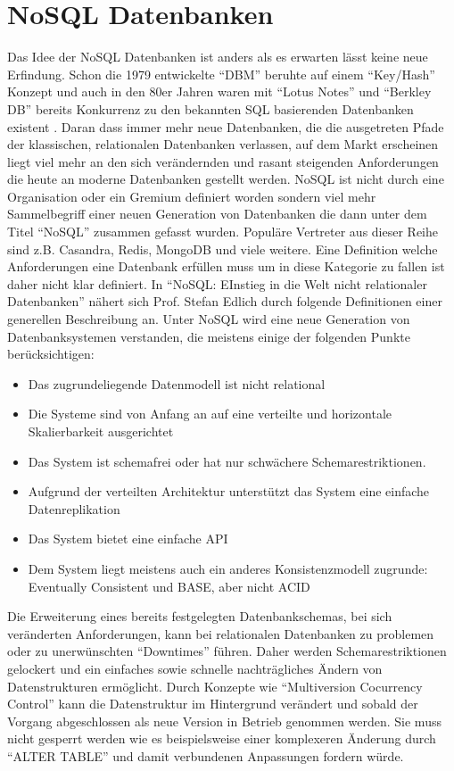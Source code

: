 \documentclass[a4paper,11pt,oneside,%
headsepline,												%
footsepline,												%
bibtotocnumbered									%
]{scrreprt}
\begin{document}
\section{NoSQL Datenbanken}
Das Idee der NoSQL Datenbanken ist anders als es erwarten lässt keine neue Erfindung. Schon die 1979 entwickelte \enquote{DBM} beruhte auf einem \enquote{Key/Hash} Konzept und auch in den 80er Jahren waren mit \enquote{Lotus Notes} und \enquote{Berkley DB} bereits Konkurrenz zu den bekannten SQL basierenden Datenbanken existent \autocite[1]{Edlich2010}. Daran dass immer mehr neue Datenbanken, die die ausgetreten Pfade der klassischen, relationalen Datenbanken verlassen, auf dem Markt erscheinen liegt viel mehr an den sich verändernden und rasant steigenden Anforderungen die heute an moderne Datenbanken gestellt werden. NoSQL ist nicht durch eine Organisation oder ein Gremium definiert worden sondern viel mehr Sammelbegriff einer neuen Generation von Datenbanken die dann unter dem Titel \enquote{NoSQL} zusammen gefasst wurden. Populäre Vertreter aus dieser Reihe sind z.B. Casandra, Redis, MongoDB und viele weitere. Eine Definition welche Anforderungen eine Datenbank erfüllen muss um in diese Kategorie zu fallen ist daher nicht klar definiert. In \enquote{NoSQL: EInstieg in die Welt nicht relationaler Datenbanken} nähert sich Prof. Stefan Edlich durch folgende Definitionen  einer generellen Beschreibung an. Unter NoSQL wird eine neue Generation von Datenbanksystemen verstanden, die meistens einige der folgenden Punkte berücksichtigen\autocite[2]{Edlich2010}:
\begin{itemize}
		\item Das zugrundeliegende Datenmodell ist nicht relational
		\item Die Systeme sind von Anfang an auf eine verteilte und horizontale Skalierbarkeit ausgerichtet
		\item Das System ist schemafrei oder hat nur schwächere Schemarestriktionen.
		\item Aufgrund der verteilten Architektur unterstützt das System eine einfache Datenreplikation
		\item Das System bietet eine einfache API
		\item Dem System liegt meistens auch ein anderes Konsistenzmodell zugrunde: Eventually Consistent und BASE, aber nicht ACID
\end{itemize}
Die Erweiterung eines bereits festgelegten Datenbankschemas, bei sich veränderten Anforderungen, kann bei relationalen Datenbanken zu problemen oder zu unerwünschten \enquote{Downtimes} führen. Daher werden Schemarestriktionen gelockert und ein einfaches sowie schnelle nachträgliches Ändern von Datenstrukturen ermöglicht. Durch Konzepte wie \enquote{Multiversion Cocurrency Control} kann die Datenstruktur im Hintergrund verändert und sobald der Vorgang abgeschlossen als neue Version in Betrieb genommen werden. Sie muss nicht gesperrt werden wie es beispielsweise einer komplexeren Änderung durch \enquote{ALTER TABLE} und damit verbundenen Anpassungen fordern würde.\\\\
\end{document}
